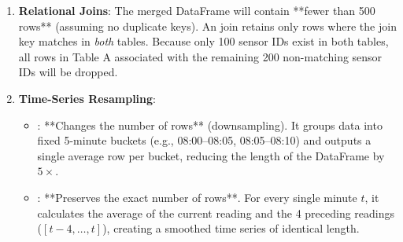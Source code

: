 \begin{enumerate}
    \item \textbf{Relational Joins}:
    The merged DataFrame will contain **fewer than 500 rows** (assuming no duplicate keys). 
    An  join retains only rows where the join key matches in \textit{both} tables. Because only 100 sensor IDs exist in both tables, all rows in Table A associated with the remaining 200 non-matching sensor IDs will be dropped.

    \item \textbf{Time-Series Resampling}:
    \begin{itemize}
        \item \textbf{}: **Changes the number of rows** (downsampling). It groups data into fixed 5-minute buckets (e.g., 08:00--08:05, 08:05--08:10) and outputs a single average row per bucket, reducing the length of the DataFrame by $5\times$.
        \item \textbf{}: **Preserves the exact number of rows**. For every single minute $t$, it calculates the average of the current reading and the 4 preceding readings ($[t-4, \dots, t]$), creating a smoothed time series of identical length.
    \end{itemize}
\end{enumerate}